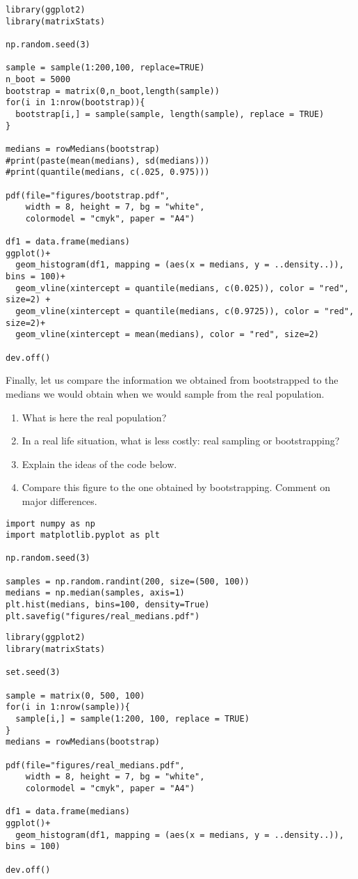 \begin{verbatim}
library(ggplot2)
library(matrixStats)

np.random.seed(3)

sample = sample(1:200,100, replace=TRUE)
n_boot = 5000
bootstrap = matrix(0,n_boot,length(sample))
for(i in 1:nrow(bootstrap)){
  bootstrap[i,] = sample(sample, length(sample), replace = TRUE)
}

medians = rowMedians(bootstrap)
#print(paste(mean(medians), sd(medians)))
#print(quantile(medians, c(.025, 0.975)))

pdf(file="figures/bootstrap.pdf",
    width = 8, height = 7, bg = "white",          
    colormodel = "cmyk", paper = "A4")

df1 = data.frame(medians)
ggplot()+
  geom_histogram(df1, mapping = (aes(x = medians, y = ..density..)), bins = 100)+
  geom_vline(xintercept = quantile(medians, c(0.025)), color = "red", size=2) +
  geom_vline(xintercept = quantile(medians, c(0.9725)), color = "red", size=2)+
  geom_vline(xintercept = mean(medians), color = "red", size=2)

dev.off()
\end{verbatim}

\begin{exercise}
Finally, let us compare the information we obtained from bootstrapped to the medians we would obtain when we would sample from the real population.
\begin{enumerate}
\item What is here the real population?
\item In a real life situation, what is less costly: real sampling or bootstrapping?
\item Explain the ideas of the code below.
\item Compare this figure to the one obtained by bootstrapping. Comment on major differences.
\end{enumerate}
\begin{verbatim}
import numpy as np
import matplotlib.pyplot as plt

np.random.seed(3)

samples = np.random.randint(200, size=(500, 100))
medians = np.median(samples, axis=1)
plt.hist(medians, bins=100, density=True)
plt.savefig("figures/real_medians.pdf")
\end{verbatim}

\begin{verbatim}
library(ggplot2)
library(matrixStats)

set.seed(3)

sample = matrix(0, 500, 100)
for(i in 1:nrow(sample)){
  sample[i,] = sample(1:200, 100, replace = TRUE)
}
medians = rowMedians(bootstrap)

pdf(file="figures/real_medians.pdf",
    width = 8, height = 7, bg = "white",          
    colormodel = "cmyk", paper = "A4")

df1 = data.frame(medians)
ggplot()+
  geom_histogram(df1, mapping = (aes(x = medians, y = ..density..)), bins = 100)

dev.off()
\end{verbatim}
\end{exercise}





